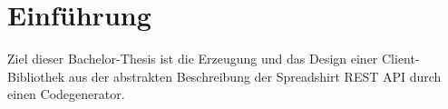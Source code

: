 \chapter{Einführung}


Ziel dieser Bachelor-Thesis ist die Erzeugung und das Design einer Client-Bibliothek aus der abstrakten Beschreibung der Spreadshirt \gls{REST} \gls{API} durch einen Codegenerator.

%

%

